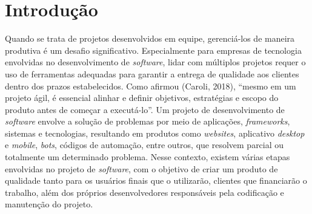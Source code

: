 \section{Introdução}


Quando se trata de projetos desenvolvidos em equipe, gerenciá-los de maneira produtiva é um desafio significativo. Especialmente para empresas de tecnologia envolvidas no desenvolvimento de \textit{software}, lidar com múltiplos projetos requer o uso de ferramentas adequadas para garantir a entrega de qualidade aos clientes dentro dos prazos estabelecidos. Como afirmou (Caroli, 2018), “mesmo em um projeto ágil, é essencial alinhar e definir objetivos, estratégias e escopo do produto antes de começar a executá-lo”. Um projeto de desenvolvimento de \textit{software} envolve a solução de problemas por meio de aplicações, \textit{frameworks}, sistemas e tecnologias, resultando em produtos como \textit{websites}, aplicativo \textit{desktop} e \textit{mobile}, \textit{bots}, códigos de automação, entre outros, que resolvem parcial ou totalmente um determinado problema. Nesse contexto, existem várias etapas envolvidas no projeto de \textit{software}, com o objetivo de criar um produto de qualidade tanto para os usuários finais que o utilizarão, clientes que financiarão o trabalho, além dos próprios desenvolvedores responsáveis pela codificação e manutenção do projeto.


